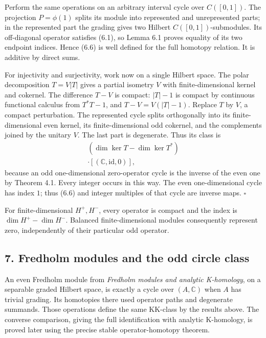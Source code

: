 \documentclass[
  11pt,
]{article}
\begin{document}
Perform the same operations on an arbitrary interval cycle over
\(C([0,1])\). The projection \(P=\phi(1)\) splits its module into
represented and unrepresented parts; in the represented part the grading
gives two Hilbert \(C([0,1])\)-submodules. Its off-diagonal operator
satisfies (6.1), so Lemma 6.1 proves equality of its two endpoint
indices. Hence (6.6) is well defined for the full homotopy relation. It
is additive by direct sums.

For injectivity and surjectivity, work now on a single Hilbert space.
The polar decomposition \(T=V|T|\) gives a partial isometry \(V\) with
finite-dimensional kernel and cokernel. The difference \(T-V\) is
compact: \(|T|-1\) is compact by continuous functional calculus from
\(T^*T-1\), and \(T-V=V(|T|-1)\). Replace \(T\) by \(V\), a compact
perturbation. The represented cycle splits orthogonally into its
finite-dimensional even kernel, its finite-dimensional odd cokernel, and
the complements joined by the unitary \(V\). The last part is
degenerate. Thus its class is \[
\begin{gathered}
(\dim\ker T-\dim\ker T^*)\\\cdot[(\mathbb C,\mathrm{id},0)],
\end{gathered}
\tag{6.7}
\] because an odd one-dimensional zero-operator cycle is the inverse of
the even one by Theorem 4.1. Every integer occurs in this way. The even
one-dimensional cycle has index \(1\); thus (6.6) and integer multiples
of that cycle are inverse maps. \(\square\)

For finite-dimensional \(H^+,H^-\), every operator is compact and the
index is \(\dim H^+-\dim H^-\). Balanced finite-dimensional modules
consequently represent zero, independently of their particular odd
operator.

\subsection{7. Fredholm modules and the odd circle
class}\label{fredholm-modules-and-the-odd-circle-class}

An even Fredholm module from \emph{Fredholm modules and analytic
K-homology}, on a separable graded Hilbert space, is exactly a cycle
over \((A,\mathbb C)\) when \(A\) has trivial grading. Its homotopies
there used operator paths and degenerate summands. Those operations
define the same KK-class by the results above. The converse comparison,
giving the full identification with analytic K-homology, is proved later
using the precise stable operator-homotopy theorem.
\end{document}
